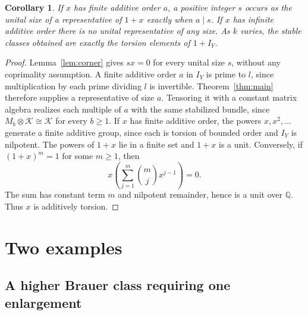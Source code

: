 \documentclass[11pt]{article}
\newtheorem{corollary}[theorem]{Corollary}
\newcommand{\K}{\mathcal K}
\newcommand{\IY}{I_Y}
\begin{document}
\begin{corollary}\label{cor:orders}
If \(x\) has finite additive order \(a\), a positive integer \(s\) occurs as the unital size of a representative of \(1+x\) exactly when \(a\mid s\). If \(x\) has infinite additive order there is no unital representative of any size. As \(k\) varies, the stable classes obtained are exactly the torsion elements of \(1+\IY\).
\end{corollary}
\begin{proof}
Lemma~\ref{lem:corner} gives \(sx=0\) for every unital size \(s\), without any coprimality assumption. A finite additive order \(a\) in \(\IY\) is prime to \(l\), since multiplication by each prime dividing \(l\) is invertible. Theorem~\ref{thm:main} therefore supplies a representative of size \(a\). Tensoring it with a constant matrix algebra realizes each multiple of \(a\) with the same stabilized bundle, since \(M_b\otimes\K\cong\K\) for every \(b\geq1\). If \(x\) has finite additive order, the powers \(x,x^2,\ldots\) generate a finite additive group, since each is torsion of bounded order and \(\IY\) is nilpotent. The powers of \(1+x\) lie in a finite set and \(1+x\) is a unit. Conversely, if \((1+x)^m=1\) for some \(m\geq1\), then
\[
 x\left(\sum_{j=1}^{m}\binom{m}{j}x^{j-1}\right)=0.
\]
The sum has constant term \(m\) and nilpotent remainder, hence is a unit over \(\mathbb Q\). Thus \(x\) is additively torsion.
\end{proof}

\section{Two examples}\label{sec:examples}

\subsection{A higher Brauer class requiring one enlargement}
\end{document}
